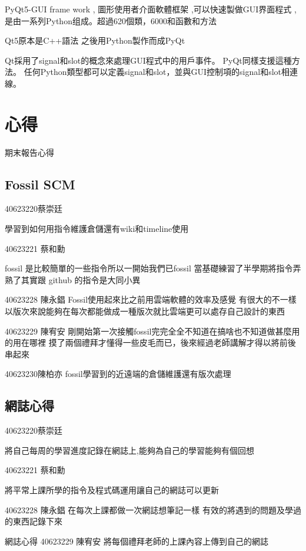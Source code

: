 \documentclass[12pt,,]{report}
\begin{document}
PyQt5-GUI frame work , 圖形使用者介面軟體框架 ,可以快速製做GUI界面程式 ,
是由一系列Python组成。超過620個類，6000和函數和方法

Qt5原本是C++語法 之後用Python製作而成PyQt

Qt採用了signal和slot的概念來處理GUI程式中的用戶事件。
PyQt同樣支援這種方法。
任何Python類型都可以定義signal和slot，並與GUI控制項的signal和slot相連線。

\hypertarget{ux5fc3ux5f97}{%
\chapter{心得}\label{ux5fc3ux5f97}}

期末報告心得

\hypertarget{fossil-scm}{%
\section{Fossil SCM}\label{fossil-scm}}

40623220蔡崇廷

學習到如何用指令維護倉儲還有wiki和timeline使用

40623221 蔡和勳

fossil 是比較簡單的一些指令所以一開始我們已fossil
當基礎練習了半學期將指令弄熟了其實跟 github 的指令是大同小異

40623228 陳永錩 Fossil使用起來比之前用雲端軟體的效率及感覺
有很大的不一樣以版次來說能夠在每次都能做成一種版次就比雲端更可以處存自己設計的東西

40623229 陳宥安
剛開始第一次接觸fossil完完全全不知道在搞啥也不知道做甚麼用的用在哪裡
摸了兩個禮拜才懂得一些皮毛而已，後來經過老師講解才得以將前後串起來

40623230陳柏亦 fossil學習到的近遠端的倉儲維護還有版次處理

\hypertarget{ux7db2ux8a8cux5fc3ux5f97}{%
\section{網誌心得}\label{ux7db2ux8a8cux5fc3ux5f97}}

40623220蔡崇廷

將自己每周的學習進度記錄在網誌上,能夠為自己的學習能夠有個回想

40623221 蔡和勳

將平常上課所學的指令及程式碼運用讓自己的網誌可以更新

40623228 陳永錩 在每次上課都做一次網誌想筆記一樣
有效的將遇到的問題及學過的東西記錄下來

網誌心得 40623229 陳宥安 將每個禮拜老師的上課內容上傳到自己的網誌
\end{document}
